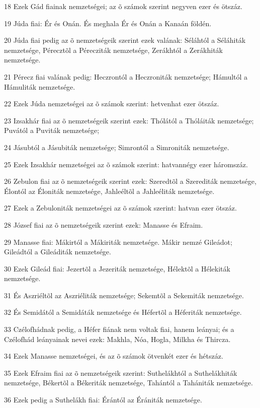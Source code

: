 \par 18 Ezek Gád fiainak nemzetségei; az õ számok szerint negyven ezer és ötszáz.
\par 19 Júda fiai: Ér és Onán. És meghala Ér és Onán a Kanaán földén.
\par 20 Júda fiai pedig az õ nemzetségeik szerint ezek valának: Séláhtól a Séláhiták nemzetsége, Pérecztõl a Pérecziták nemzetsége, Zerákhtól a Zerákhiták nemzetsége.
\par 21 Pérecz fiai valának pedig: Heczrontól a Heczroniták nemzetsége; Hámultól a Hámuliták nemzetsége.
\par 22 Ezek Júda nemzetségei az õ számok szerint: hetvenhat ezer ötszáz.
\par 23 Izsakhár fiai az õ nemzetségeik szerint ezek: Thólától a Thóláiták nemzetsége; Puvától a Puviták nemzetsége;
\par 24 Jásubtól a Jásubiták nemzetsége; Simrontól a Simroniták nemzetsége.
\par 25 Ezek Izsakhár nemzetségei az õ számok szerint: hatvannégy ezer háromszáz.
\par 26 Zebulon fiai az õ nemzetségeik szerint ezek: Szeredtõl a Szerediták nemzetsége, Élontól az Éloniták nemzetsége, Jahleéltõl a Jahleéliták nemzetsége.
\par 27 Ezek a Zebuloniták nemzetségei az õ számok szerint: hatvan ezer ötszáz.
\par 28 József fiai az õ nemzetségeik szerint ezek: Manasse és Efraim.
\par 29 Manasse fiai: Mákirtól a Mákiriták nemzetsége. Mákir nemzé Gileádot; Gileádtól a Gileáditák nemzetsége.
\par 30 Ezek Gileád fiai: Jezertõl a Jezeriták nemzetsége, Hélektõl a Hélekiták nemzetsége.
\par 31 És Aszriéltõl az Aszriéliták nemzetsége; Sekemtõl a Sekemiták nemzetsége.
\par 32 És Semidától a Semidáták nemzetsége és Héfertõl a Héferiták nemzetsége.
\par 33 Czélofhádnak pedig, a Héfer fiának nem voltak fiai, hanem leányai; és a Czélofhád leányainak nevei ezek: Makhla, Nóa, Hogla, Milkha és Thircza.
\par 34 Ezek Manasse nemzetségei, és az õ számok ötvenkét ezer és hétszáz.
\par 35 Ezek Efraim fiai az õ nemzetségeik szerint: Suthelákhtól a Suthelákhiták nemzetsége, Békertõl a Békeriták nemzetsége, Tahántól a Tahániták nemzetsége.
\par 36 Ezek pedig a Suthelákh fiai: Érántól az Érániták nemzetsége.
